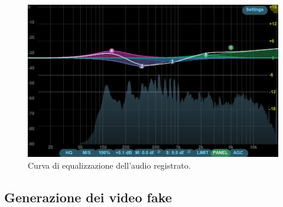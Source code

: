\begin{figure}[t]
    \centering
    \includegraphics[width=0.62\linewidth]{images/eq_curve}
    \caption{Curva di equalizzazione dell'audio registrato.}
    \label{fig:eq_curve}
\end{figure}

\subsection{Generazione dei video fake}

\clearpage